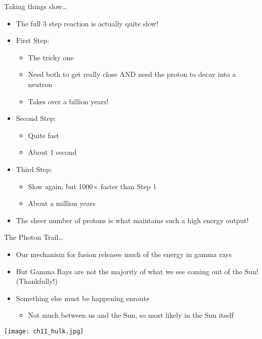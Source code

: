 \documentclass[pdf, aspectratio=169]{beamer}
\begin{document}
\begin{frame}{Taking things slow\ldots}
  \begin{itemize}
	\item The full 3 step reaction is actually quite slow!
	\item First Step:
	  \begin{itemize}
		\item The tricky one
		\item Need both to get \alert{really} close AND need the proton to decay into a neutron
		\item Takes over a billion years!
	  \end{itemize}
	\item Second Step:
	  \begin{itemize}
		\item Quite fast
		\item About 1 second
	  \end{itemize}
	\item Third Step:
	  \begin{itemize}
		\item Slow again, but 1000$\times$ faster than Step 1
		\item About a million years
	  \end{itemize}
	\item The sheer number of protons is what maintains such a high energy output!
  \end{itemize}
\end{frame}

\begin{frame}{The Photon Trail\ldots}
  \begin{itemize}
	\item Our mechanism for fusion releases much of the energy in gamma rays
	\item But Gamma Rays are not the majority of what we see coming out of the Sun! (Thankfully!)
	\item Something else must be happening enroute
	  \begin{itemize}
		\item Not much between us and the Sun, so most likely in the Sun itself
	  \end{itemize}
  \end{itemize}
  \begin{center}
	\texttt{[image: ch11\_hulk.jpg]}
  \end{center}
\end{frame}
\end{document}

